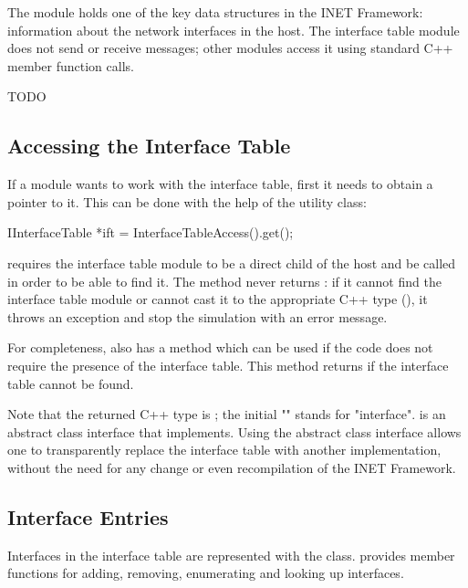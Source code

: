 The  module holds one of the key data structures in
the INET Framework: information about the network interfaces in the host.
The interface table module does not send or receive messages; other modules
access it using standard C++ member function calls.

\ifdraft TODO
\subsection{Accessing the Interface Table}

If a module wants to work with the interface table, first it needs to obtain a
pointer to it. This can be done with the help of the
 utility class:

\begin{cpp}
IInterfaceTable *ift = InterfaceTableAccess().get();
\end{cpp}

 requires the interface table module to be a
direct child of the host and be called  in order to
be able to find it. The  method never returns : if
it cannot find the interface table module or cannot cast it to the
appropriate C++ type (), it throws an exception
and stop the simulation with an error message.

For completeness,  also has a
 method which can be used if the code does not require
the presence of the interface table. This method returns  if the
interface table cannot be found.

Note that the returned C++ type is ; the initial
"" stands for "interface".  is an abstract
class interface that  implements. Using the abstract
class interface allows one to transparently replace the interface table with
another implementation, without the need for any change or even
recompilation of the INET Framework.
\fi

\subsection{Interface Entries}

Interfaces in the interface table are represented with the
 class.  provides member
functions for adding, removing, enumerating and looking up interfaces.

